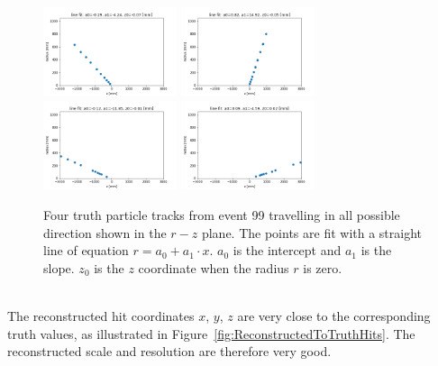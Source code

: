 \begin{figure}[htb]
\centering
\includegraphics[width=0.35\textwidth]{plots/particle_553945090628780032_r_vs_z.png}
\includegraphics[width=0.35\textwidth]{plots/particle_540433329673994240_r_vs_z.png}\\
\includegraphics[width=0.35\textwidth]{plots/particle_94575729613733888_r_vs_z.png}
\includegraphics[width=0.35\textwidth]{plots/particle_99081047228022784_r_vs_z.png}
\caption{Four truth particle tracks from event 99 travelling in all possible direction shown in the $r-z$ plane. The points are fit with a straight line of equation $r = a_0 + a_1 \cdot x$. $a_0$ is the intercept and $a_1$ is the slope.  $z_0$ is the $z$ coordinate when the radius $r$ is zero.}
\label{fig:TruthParticleTracks}
\end{figure}

\ \\The reconstructed hit coordinates $x$, $y$, $z$ are very close to the corresponding truth values, as illustrated in Figure~\ref{fig:ReconstructedToTruthHits}. The reconstructed scale and resolution are therefore very good. 

